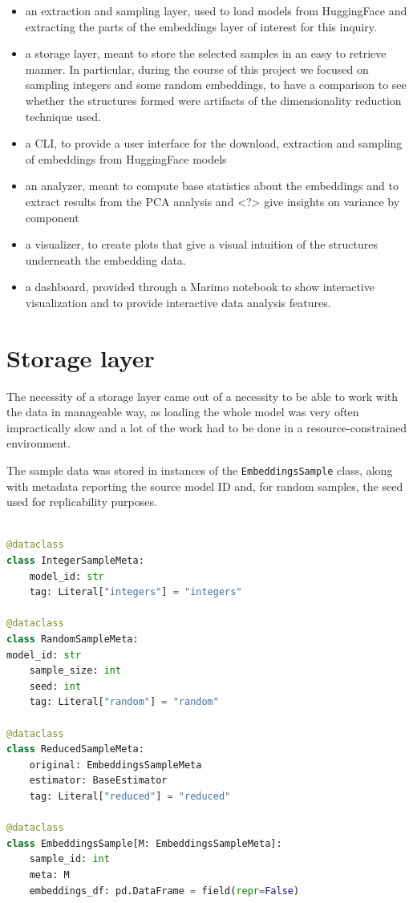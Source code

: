 \documentclass[
  a4paper, twoside, 10pt, titlepage]{book}
\begin{document}
\begin{itemize}
\item
  an extraction and sampling layer, used to load models from HuggingFace
  and extracting the parts of the embeddings layer of interest for this
  inquiry.
\item
  a storage layer, meant to store the selected samples in an easy to
  retrieve manner. In particular, during the course of this project we
  focused on sampling integers and some random embeddings, to have a
  comparison to see whether the structures formed were artifacts of the
  dimensionality reduction technique used.
\item
  a CLI, to provide a user interface for the download, extraction and
  sampling of embeddings from HuggingFace models
\item
  an analyzer, meant to compute base statistics about the embeddings and
  to extract results from the PCA analysis and \textless?\textgreater{}
  give insights on variance by component
\item
  a visualizer, to create plots that give a visual intuition of the
  structures underneath the embedding data.
\item
  a dashboard, provided through a Marimo notebook to show interactive
  visualization and to provide interactive data analysis features.
\end{itemize}

\section{Storage layer}\label{storage-layer}

The necessity of a storage layer came out of a necessity to be able to
work with the data in manageable way, as loading the whole model was
very often impractically slow and a lot of the work had to be done in a
resource-constrained environment.

The sample data was stored in instances of the
\passthrough{\lstinline!EmbeddingsSample!} class, along with metadata
reporting the source model ID and, for random samples, the seed used for
replicability purposes.

\begin{lstlisting}[language=Python]

@dataclass
class IntegerSampleMeta:
    model_id: str
    tag: Literal["integers"] = "integers"

@dataclass
class RandomSampleMeta:
model_id: str
    sample_size: int
    seed: int
    tag: Literal["random"] = "random"

@dataclass
class ReducedSampleMeta:
    original: EmbeddingsSampleMeta
    estimator: BaseEstimator
    tag: Literal["reduced"] = "reduced"

@dataclass
class EmbeddingsSample[M: EmbeddingsSampleMeta]:
    sample_id: int
    meta: M
    embeddings_df: pd.DataFrame = field(repr=False)
\end{lstlisting}
\end{document}
